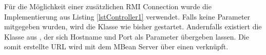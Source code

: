  F\"ur die M\"oglichkeit einer zus\"atzlichen RMI Connection wurde die Implementierung aus Listing \ref{lstController1} verwendet. Falls keine Parameter mitgegeben wurden, wird die Klasse  wie bisher gestartet. Andernfalls existiert die Klasse  aus , der sich Hostname und Port als Parameter \"ubergeben lassen. Die somit erstellte URL wird mit dem MBean Server \"uber einen  verkn\"upft.

\begin{figure}[!htb]
	
\end{figure}
